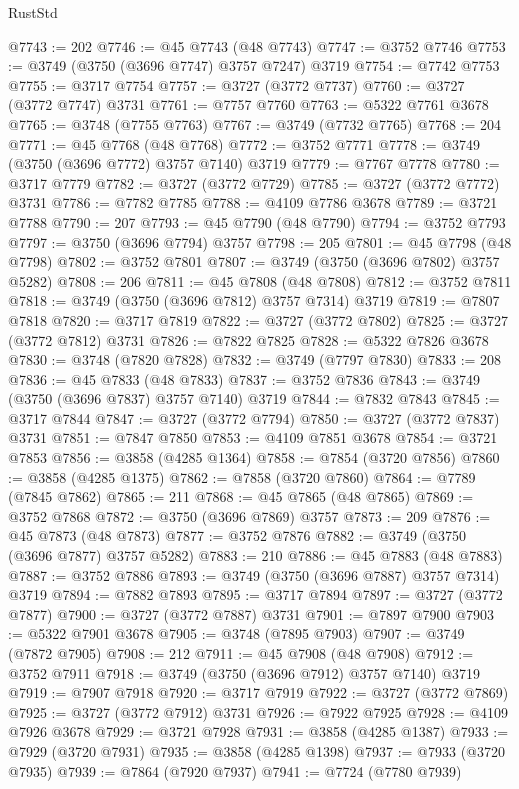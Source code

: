 \begin{lexlean}{RustStd}
\begin{coremodule}
@7743 := 202
@7746 := @45 @7743 (@48 @7743)
@7747 := @3752 @7746
@7753 := @3749 (@3750 (@3696 @7747) @3757 @7247) @3719
@7754 := @7742 @7753
@7755 := @3717 @7754
@7757 := @3727 (@3772 @7737)
@7760 := @3727 (@3772 @7747) @3731
@7761 := @7757 @7760
@7763 := @5322 @7761 @3678
@7765 := @3748 (@7755 @7763)
@7767 := @3749 (@7732 @7765)
@7768 := 204
@7771 := @45 @7768 (@48 @7768)
@7772 := @3752 @7771
@7778 := @3749 (@3750 (@3696 @7772) @3757 @7140) @3719
@7779 := @7767 @7778
@7780 := @3717 @7779
@7782 := @3727 (@3772 @7729)
@7785 := @3727 (@3772 @7772) @3731
@7786 := @7782 @7785
@7788 := @4109 @7786 @3678
@7789 := @3721 @7788
@7790 := 207
@7793 := @45 @7790 (@48 @7790)
@7794 := @3752 @7793
@7797 := @3750 (@3696 @7794) @3757
@7798 := 205
@7801 := @45 @7798 (@48 @7798)
@7802 := @3752 @7801
@7807 := @3749 (@3750 (@3696 @7802) @3757 @5282)
@7808 := 206
@7811 := @45 @7808 (@48 @7808)
@7812 := @3752 @7811
@7818 := @3749 (@3750 (@3696 @7812) @3757 @7314) @3719
@7819 := @7807 @7818
@7820 := @3717 @7819
@7822 := @3727 (@3772 @7802)
@7825 := @3727 (@3772 @7812) @3731
@7826 := @7822 @7825
@7828 := @5322 @7826 @3678
@7830 := @3748 (@7820 @7828)
@7832 := @3749 (@7797 @7830)
@7833 := 208
@7836 := @45 @7833 (@48 @7833)
@7837 := @3752 @7836
@7843 := @3749 (@3750 (@3696 @7837) @3757 @7140) @3719
@7844 := @7832 @7843
@7845 := @3717 @7844
@7847 := @3727 (@3772 @7794)
@7850 := @3727 (@3772 @7837) @3731
@7851 := @7847 @7850
@7853 := @4109 @7851 @3678
@7854 := @3721 @7853
@7856 := @3858 (@4285 @1364)
@7858 := @7854 (@3720 @7856)
@7860 := @3858 (@4285 @1375)
@7862 := @7858 (@3720 @7860)
@7864 := @7789 (@7845 @7862)
@7865 := 211
@7868 := @45 @7865 (@48 @7865)
@7869 := @3752 @7868
@7872 := @3750 (@3696 @7869) @3757
@7873 := 209
@7876 := @45 @7873 (@48 @7873)
@7877 := @3752 @7876
@7882 := @3749 (@3750 (@3696 @7877) @3757 @5282)
@7883 := 210
@7886 := @45 @7883 (@48 @7883)
@7887 := @3752 @7886
@7893 := @3749 (@3750 (@3696 @7887) @3757 @7314) @3719
@7894 := @7882 @7893
@7895 := @3717 @7894
@7897 := @3727 (@3772 @7877)
@7900 := @3727 (@3772 @7887) @3731
@7901 := @7897 @7900
@7903 := @5322 @7901 @3678
@7905 := @3748 (@7895 @7903)
@7907 := @3749 (@7872 @7905)
@7908 := 212
@7911 := @45 @7908 (@48 @7908)
@7912 := @3752 @7911
@7918 := @3749 (@3750 (@3696 @7912) @3757 @7140) @3719
@7919 := @7907 @7918
@7920 := @3717 @7919
@7922 := @3727 (@3772 @7869)
@7925 := @3727 (@3772 @7912) @3731
@7926 := @7922 @7925
@7928 := @4109 @7926 @3678
@7929 := @3721 @7928
@7931 := @3858 (@4285 @1387)
@7933 := @7929 (@3720 @7931)
@7935 := @3858 (@4285 @1398)
@7937 := @7933 (@3720 @7935)
@7939 := @7864 (@7920 @7937)
@7941 := @7724 (@7780 @7939)

\end{coremodule}
\end{lexlean}
